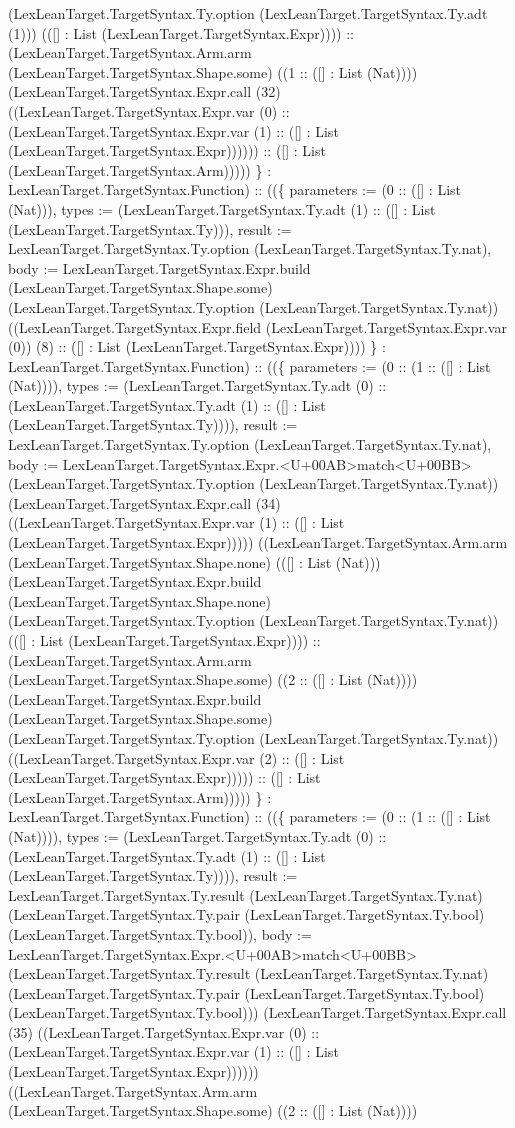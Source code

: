 \documentclass[11pt]{article}
\begin{document}
(LexLeanTarget.TargetSyntax.Ty.option (LexLeanTarget.TargetSyntax.Ty.adt (1))) (([] : List (LexLeanTarget.TargetSyntax.Expr)))) :: (LexLeanTarget.TargetSyntax.Arm.arm (LexLeanTarget.TargetSyntax.Shape.some) ((1 :: ([] : List (Nat)))) (LexLeanTarget.TargetSyntax.Expr.call (32) ((LexLeanTarget.TargetSyntax.Expr.var (0) :: (LexLeanTarget.TargetSyntax.Expr.var (1) :: ([] : List (LexLeanTarget.TargetSyntax.Expr)))))) :: ([] : List (LexLeanTarget.TargetSyntax.Arm))))) \} : LexLeanTarget.TargetSyntax.Function) :: ((\{ parameters := (0 :: ([] : List (Nat))), types := (LexLeanTarget.TargetSyntax.Ty.adt (1) :: ([] : List (LexLeanTarget.TargetSyntax.Ty))), result := LexLeanTarget.TargetSyntax.Ty.option (LexLeanTarget.TargetSyntax.Ty.nat), body := LexLeanTarget.TargetSyntax.Expr.build (LexLeanTarget.TargetSyntax.Shape.some) (LexLeanTarget.TargetSyntax.Ty.option (LexLeanTarget.TargetSyntax.Ty.nat)) ((LexLeanTarget.TargetSyntax.Expr.field (LexLeanTarget.TargetSyntax.Expr.var (0)) (8) :: ([] : List (LexLeanTarget.TargetSyntax.Expr)))) \} : LexLeanTarget.TargetSyntax.Function) :: ((\{ parameters := (0 :: (1 :: ([] : List (Nat)))), types := (LexLeanTarget.TargetSyntax.Ty.adt (0) :: (LexLeanTarget.TargetSyntax.Ty.adt (1) :: ([] : List (LexLeanTarget.TargetSyntax.Ty)))), result := LexLeanTarget.TargetSyntax.Ty.option (LexLeanTarget.TargetSyntax.Ty.nat), body := LexLeanTarget.TargetSyntax.Expr.<U+00AB>match<U+00BB> (LexLeanTarget.TargetSyntax.Ty.option (LexLeanTarget.TargetSyntax.Ty.nat)) (LexLeanTarget.TargetSyntax.Expr.call (34) ((LexLeanTarget.TargetSyntax.Expr.var (1) :: ([] : List (LexLeanTarget.TargetSyntax.Expr))))) ((LexLeanTarget.TargetSyntax.Arm.arm (LexLeanTarget.TargetSyntax.Shape.none) (([] : List (Nat))) (LexLeanTarget.TargetSyntax.Expr.build (LexLeanTarget.TargetSyntax.Shape.none) (LexLeanTarget.TargetSyntax.Ty.option (LexLeanTarget.TargetSyntax.Ty.nat)) (([] : List (LexLeanTarget.TargetSyntax.Expr)))) :: (LexLeanTarget.TargetSyntax.Arm.arm (LexLeanTarget.TargetSyntax.Shape.some) ((2 :: ([] : List (Nat)))) (LexLeanTarget.TargetSyntax.Expr.build (LexLeanTarget.TargetSyntax.Shape.some) (LexLeanTarget.TargetSyntax.Ty.option (LexLeanTarget.TargetSyntax.Ty.nat)) ((LexLeanTarget.TargetSyntax.Expr.var (2) :: ([] : List (LexLeanTarget.TargetSyntax.Expr))))) :: ([] : List (LexLeanTarget.TargetSyntax.Arm))))) \} : LexLeanTarget.TargetSyntax.Function) :: ((\{ parameters := (0 :: (1 :: ([] : List (Nat)))), types := (LexLeanTarget.TargetSyntax.Ty.adt (0) :: (LexLeanTarget.TargetSyntax.Ty.adt (1) :: ([] : List (LexLeanTarget.TargetSyntax.Ty)))), result := LexLeanTarget.TargetSyntax.Ty.result (LexLeanTarget.TargetSyntax.Ty.nat) (LexLeanTarget.TargetSyntax.Ty.pair (LexLeanTarget.TargetSyntax.Ty.bool) (LexLeanTarget.TargetSyntax.Ty.bool)), body := LexLeanTarget.TargetSyntax.Expr.<U+00AB>match<U+00BB> (LexLeanTarget.TargetSyntax.Ty.result (LexLeanTarget.TargetSyntax.Ty.nat) (LexLeanTarget.TargetSyntax.Ty.pair (LexLeanTarget.TargetSyntax.Ty.bool) (LexLeanTarget.TargetSyntax.Ty.bool))) (LexLeanTarget.TargetSyntax.Expr.call (35) ((LexLeanTarget.TargetSyntax.Expr.var (0) :: (LexLeanTarget.TargetSyntax.Expr.var (1) :: ([] : List (LexLeanTarget.TargetSyntax.Expr)))))) ((LexLeanTarget.TargetSyntax.Arm.arm (LexLeanTarget.TargetSyntax.Shape.some) ((2 :: ([] : List (Nat)))) 
\end{document}
